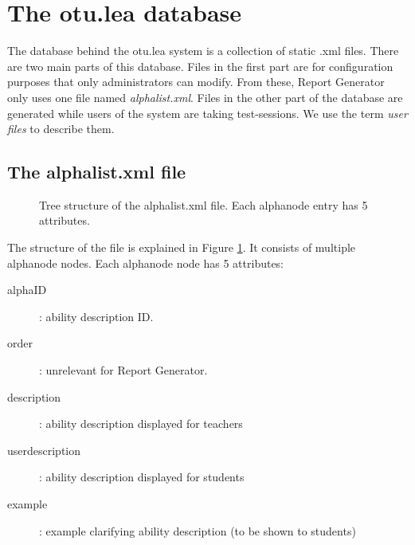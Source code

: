 \documentclass{scrartcl}
\begin{document}
\section{The otu.lea database}
The database behind the otu.lea system is a collection of static .xml files. There are two main parts of this database. Files in the first part are for configuration purposes that only administrators can modify. From these, Report Generator only uses one file named \emph{alphalist.xml}. Files in the other part of the database are generated while users of the system are taking test-sessions. We use the term \emph{user files} to describe them.
\subsection{The alphalist.xml file}
\begin{figure}
\begin{center}
\end{center}
\caption{Tree structure of the alphalist.xml file. Each alphanode entry has 5 attributes.}
\label{fig:alphalist}
\end{figure}
The structure of the file is explained in Figure \ref{fig:alphalist}. It consists of multiple alphanode nodes. Each alphanode node has 5 attributes:
\begin{description}
\item[alphaID]: ability description ID.
\item[order]: unrelevant for Report Generator.
\item[description]: ability description displayed for teachers
\item[userdescription]: ability description displayed for students 
\item[example]: example clarifying ability description (to be shown to students)
\end{description}
\end{document}
